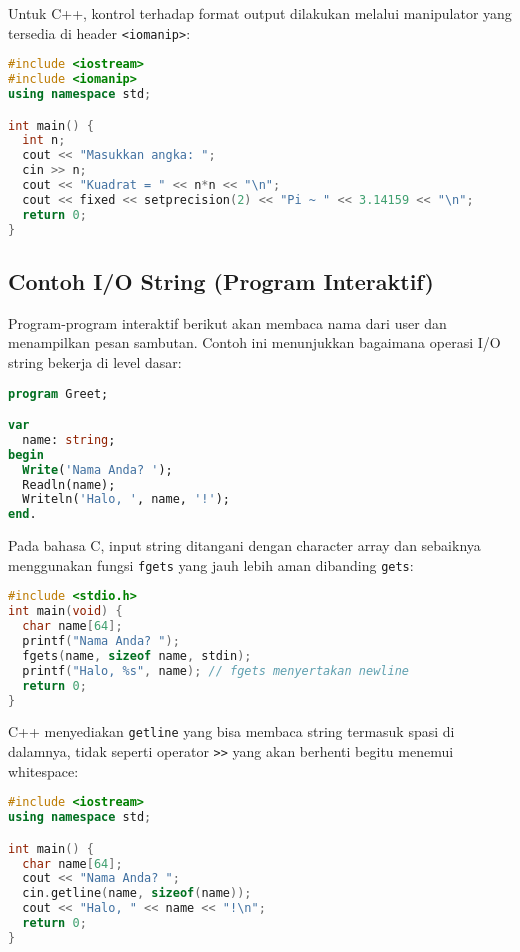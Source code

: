 \documentclass[../main.tex]{subfiles}
\begin{document}
Untuk C++, kontrol terhadap format output dilakukan melalui manipulator yang tersedia di header \texttt{<iomanip>}:

\begin{lstlisting}[language=C++, caption={Baca integer dan format keluaran (C++)}]
#include <iostream>
#include <iomanip>
using namespace std;

int main() {
  int n;
  cout << "Masukkan angka: ";
  cin >> n;
  cout << "Kuadrat = " << n*n << "\n";
  cout << fixed << setprecision(2) << "Pi ~ " << 3.14159 << "\n";
  return 0;
}
\end{lstlisting}

\subsection{Contoh I/O String (Program Interaktif)}

Program-program interaktif berikut akan membaca nama dari user dan menampilkan pesan sambutan. Contoh ini menunjukkan bagaimana operasi I/O string bekerja di level dasar:

\begin{lstlisting}[language=Pascal, caption={Input nama pada Pascal}]
program Greet;

var
  name: string;
begin
  Write('Nama Anda? ');
  Readln(name);
  Writeln('Halo, ', name, '!');
end.
\end{lstlisting}

Pada bahasa C, input string ditangani dengan character array dan sebaiknya menggunakan fungsi \texttt{fgets} yang jauh lebih aman dibanding \texttt{gets}:

\begin{lstlisting}[language=C, caption={Input nama pada C}]
#include <stdio.h>
int main(void) {
  char name[64];
  printf("Nama Anda? ");
  fgets(name, sizeof name, stdin);
  printf("Halo, %s", name); // fgets menyertakan newline
  return 0;
}
\end{lstlisting}

C++ menyediakan \texttt{getline} yang bisa membaca string termasuk spasi di dalamnya, tidak seperti operator \texttt{>>} yang akan berhenti begitu menemui whitespace:

\begin{lstlisting}[language=C++, caption={Input nama pada C++}]
#include <iostream>
using namespace std;

int main() {
  char name[64];
  cout << "Nama Anda? ";
  cin.getline(name, sizeof(name));
  cout << "Halo, " << name << "!\n";
  return 0;
}
\end{lstlisting}
\end{document}
